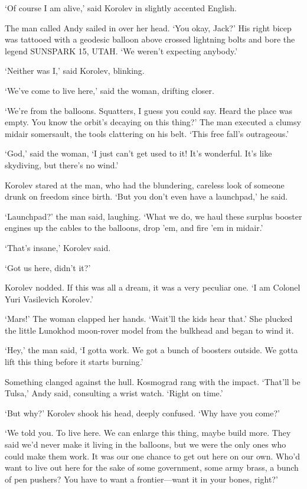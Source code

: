 `Of course I am alive,' said Korolev in slightly accented English.

The man called Andy sailed in over her head. `You okay, Jack?' His right bicep was tattooed with a geodesic balloon above crossed lightning bolts and bore the legend SUNSPARK 15, UTAH. `We weren't expecting anybody.'

`Neither was I,' said Korolev, blinking.

`We've come to live here,' said the woman, drifting closer.

`We're from the balloons. Squatters, I guess you could say. Heard the place was empty. You know the orbit's decaying on this thing?' The man executed a clumsy midair somersault, the tools clattering on his belt. `This free fall's outrageous.'

`God,' said the woman, `I just can't get used to it! It's wonderful. It's like skydiving, but there's no wind.'

Korolev stared at the man, who had the blundering, careless look of someone drunk on freedom since birth. `But you don't even have a launchpad,' he said.

`Launchpad?' the man said, laughing. `What we do, we haul these surplus booster engines up the cables to the balloons, drop 'em, and fire 'em in midair.'

`That's insane,' Korolev said.

`Got us here, didn't it?'

Korolev nodded. If this was all a dream, it was a very peculiar one. `I am Colonel Yuri Vasilevich Korolev.'

`Mars!' The woman clapped her hands. `Wait'll the kids hear that.' She plucked the little Lunokhod moon-rover model from the bulkhead and began to wind it.

`Hey,' the man said, `I gotta work. We got a bunch of boosters outside. We gotta lift this thing before it starts burning.'

Something clanged against the hull. Kosmograd rang with the impact. `That'll be Tulsa,' Andy said, consulting a wrist watch. `Right on time.'

`But why?' Korolev shook his head, deeply confused. `Why have you come?'

`We told you. To live here. We can enlarge this thing, maybe build more. They said we'd never make it living in the balloons, but we were the only ones who could make them work. It was our one chance to get out here on our own. Who'd want to live out here for the sake of some government, some army brass, a bunch of pen pushers? You have to want a frontier---want it in your bones, right?'

